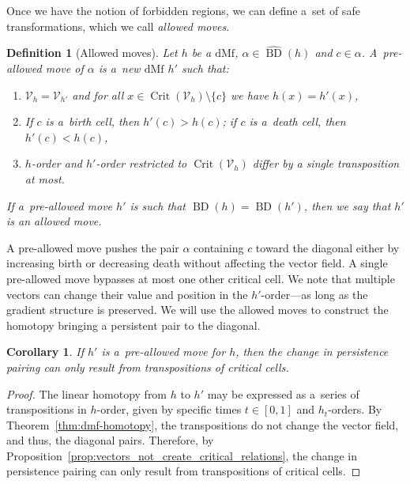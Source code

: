 \documentclass[a4paper,12pt, USenglish,cleveref,autoref,thm-restate]{article}
\newtheorem{corollary}[theorem]{Corollary}
\newtheorem{definition}[theorem]{Definition}
\newcommand{\mf}{h}
\newcommand{\omf}{h'}
\DeclareMathOperator{\bd}{BD}
\newcommand{\upbd}{\hat{\bd}}
\newcommand{\dmf}{\text{dMf}}
\newcommand{\cc}{c}
\newcommand{\bds}{\alpha}
\newcommand{\cV}{\mathcal{V}}
\DeclareMathOperator{\crit}{Crit}
\begin{document}
\noindent Once we have the notion of forbidden regions, we can define a~set of safe transformations, which we call \emph{allowed moves}.



\begin{definition}[Allowed moves]
    Let $\mf$ be a $\dmf$, $\bds\in\upbd(\mf)$ and $\cc\in\bds$.
    A~\emph{pre-allowed move} of $\bds$ is a~new $\dmf$ $\omf$ such that:
    \begin{enumerate}[label=(\arabic*)]
        \item $\cV_{\mf} = \cV_{\omf}$ and for all $x\in\crit(\cV_\mf)\setminus\{c\}$ we have $\mf(x)=\omf(x)$,
        \item If $\cc$ is a~birth cell, then $\omf(\cc) > \mf(\cc) $; if $\cc$ is a~death cell, then $\omf(\cc) < \mf(\cc) $,
        \item\label{it:single-transposition} $\mf$-order and $\omf$-order restricted to $\crit(\cV_{\mf})$ differ by a single transposition at most.
    \end{enumerate}
   If a~pre-allowed move $\omf$ is such that $\bd(\mf) = \bd(\omf)$, then we say that $\omf$ is an \emph{allowed move}.
\end{definition}

\noindent A pre-allowed move pushes the pair $\alpha$ containing $\cc$ toward the diagonal either by increasing birth or decreasing death without affecting the vector field.
A single pre-allowed move bypasses at most one other critical cell. 
We note that multiple vectors can change their value and position in the $\omf$-order---as long as the gradient structure is preserved.
We will use the allowed moves to construct the homotopy bringing a persistent pair to the diagonal.

\begin{corollary}\label{cor:vectors_are_unimportant}
    If $\omf$ is a~pre-allowed move for $\mf$, then
    the change in persistence pairing can only result from transpositions of critical cells.
\end{corollary}
\begin{proof}
     The linear homotopy from $\mf$ to $\omf$ may be expressed as a~series of transpositions in $\mf$-order, given by specific times $t \in [0,1]$ and $\mf_{t}$-orders. 
    By Theorem~\ref{thm:dmf-homotopy}, the transpositions do not change the vector field, and thus, the diagonal pairs.
    Therefore, by Proposition~\ref{prop:vectors_not_create_critical_relations}, the change in persistence pairing can only result from transpositions of critical cells.
\end{proof}
\end{document}
